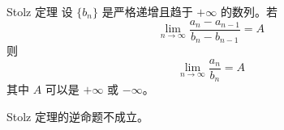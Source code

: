 \begin{theorem}{Stolz 定理}
  设 $\{b_n\}$ 是严格递增且趋于 $+\infty$ 的数列。若
  \[\lim_{n \to \infty}\frac{a_{n} - a_{n - 1}}{b_{n} - b_{n - 1}} = A\]
  则
  \[\lim_{n \to \infty}\frac{a_n}{b_n} = A\]
  其中 $A$ 可以是 $+\infty$ 或 $-\infty$。
\end{theorem}

\begin{remark}
  Stolz 定理的逆命题不成立。
\end{remark}


\section{}







\section{}







\section{}







\section{}







\section{}







\section{}






